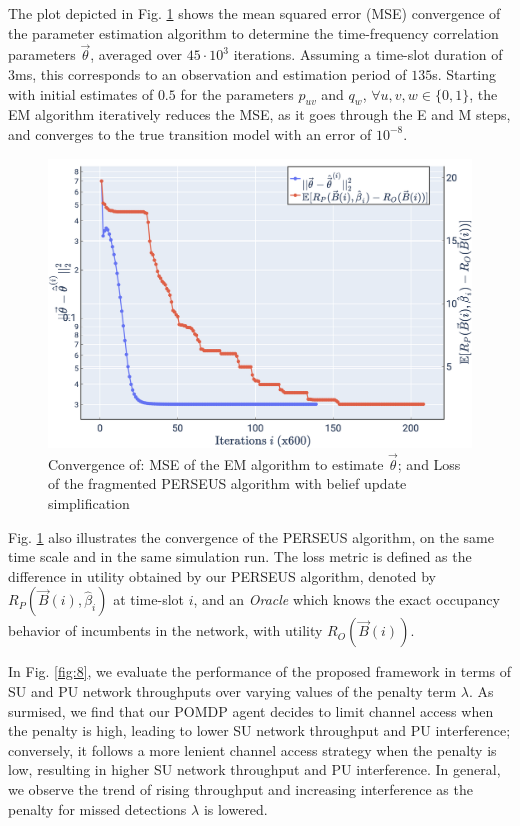 \documentclass[10pt,twocolumn]{IEEEtran}
\begin{document}
The plot depicted in Fig. \ref{fig:4} shows the mean squared error (MSE) convergence of the parameter estimation algorithm to determine the time-frequency correlation parameters $\vec{\theta}$, averaged over $45{\cdot} 10^3$ iterations. Assuming a time-slot duration of $3$ms, this corresponds 
to an observation and estimation period of $135$s. Starting with initial estimates of $0.5$ for the parameters $p_{uv}$ and $q_{w}$, ${\forall}u,v,w{\in}\{0,1\}$, the EM algorithm iteratively reduces the MSE, as it goes through the E and M steps, and converges to the true transition model with an error of $10^{-8}$.
\begin{figure}
    \centering
    \includegraphics[width=0.78\linewidth]{PerseusRegretConvergence_MeanSquareErrorConvergence.png}
    \caption{Convergence of: MSE of the EM algorithm to estimate $\vec{\theta}$; and Loss of the fragmented PERSEUS algorithm with belief update simplification}
    \vspace{-5mm}
    \label{fig:4}
\end{figure}
Fig. \ref{fig:4} also illustrates the convergence of the PERSEUS algorithm, on the same time scale and in the same simulation run. The loss metric is defined as the difference in utility obtained by our PERSEUS algorithm, denoted by $R_{P}(\vec{B}(i), \hat{\beta}_{i})$ at time-slot $i$, and an \emph{Oracle} which knows the exact occupancy behavior of incumbents in the network, with utility $R_{O}(\vec{B}(i))$.

In Fig. \ref{fig:8}, we evaluate the performance of the proposed framework in terms of SU and PU network throughputs over varying values of the penalty term $\lambda$. As surmised, we find that our POMDP agent decides to limit channel access when the penalty is high, leading to lower SU network throughput and PU interference; conversely, it follows a more lenient channel access strategy when the penalty is low, resulting in higher SU network throughput and PU interference. In general, we observe the trend of rising throughput and increasing interference as the penalty for missed detections $\lambda$ is lowered.
\end{document}

